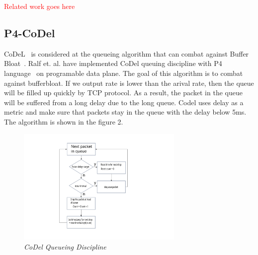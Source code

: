 \textcolor{red}{Related work goes here}
\subsection{P4-CoDel}
CoDeL~\cite{nichols2013controlled} is considered at the queueing algorithm that can combat against Buffer Bloat~\cite{gettys2012bufferbloat}. Ralf et. al. have implemented CoDel queuing discipline with P4 language~\cite{bosshart2014p4} on programable data plane. The goal of this algorithm is to combat against bufferbloat. If we output rate is lower than the arival rate, then the queue will be filled up quickly by TCP protocol. As a result, the packet in the queue will be suffered from a long delay due to the long queue. Codel uses delay as a metric and make sure that packets stay in the queue with the delay below 5ms. The algorithm is shown in the figure 2. 
\begin{figure}[h]
\centering
\includegraphics*[width=8cm]{codel}
\caption{\em CoDel Queueing Discipline}
\label{fig:tcp}
\end{figure}